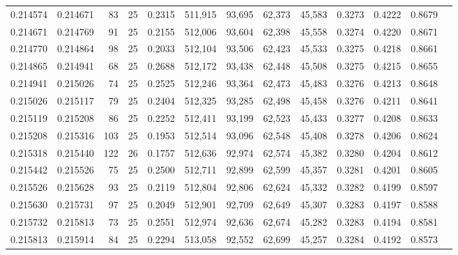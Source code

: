 \begin{tabular}{rrrrrrrrrrrrr}
0.214574 & 0.214671 &    83 &  25 &                                     0.2315 & 511,915 &  93,695 &  62,373 &  45,583 & 0.3273 & 0.4222 & 0.8679 \\
0.214671 & 0.214769 &    91 &  25 &                                     0.2155 & 512,006 &  93,604 &  62,398 &  45,558 & 0.3274 & 0.4220 & 0.8671 \\
0.214770 & 0.214864 &    98 &  25 &                                     0.2033 & 512,104 &  93,506 &  62,423 &  45,533 & 0.3275 & 0.4218 & 0.8661 \\
0.214865 & 0.214941 &    68 &  25 &                                     0.2688 & 512,172 &  93,438 &  62,448 &  45,508 & 0.3275 & 0.4215 & 0.8655 \\
0.214941 & 0.215026 &    74 &  25 &                                     0.2525 & 512,246 &  93,364 &  62,473 &  45,483 & 0.3276 & 0.4213 & 0.8648 \\
0.215026 & 0.215117 &    79 &  25 &                                     0.2404 & 512,325 &  93,285 &  62,498 &  45,458 & 0.3276 & 0.4211 & 0.8641 \\
0.215119 & 0.215208 &    86 &  25 &                                     0.2252 & 512,411 &  93,199 &  62,523 &  45,433 & 0.3277 & 0.4208 & 0.8633 \\
0.215208 & 0.215316 &   103 &  25 &                                     0.1953 & 512,514 &  93,096 &  62,548 &  45,408 & 0.3278 & 0.4206 & 0.8624 \\
0.215318 & 0.215440 &   122 &  26 &                                     0.1757 & 512,636 &  92,974 &  62,574 &  45,382 & 0.3280 & 0.4204 & 0.8612 \\
0.215442 & 0.215526 &    75 &  25 &                                     0.2500 & 512,711 &  92,899 &  62,599 &  45,357 & 0.3281 & 0.4201 & 0.8605 \\
0.215526 & 0.215628 &    93 &  25 &                                     0.2119 & 512,804 &  92,806 &  62,624 &  45,332 & 0.3282 & 0.4199 & 0.8597 \\
0.215630 & 0.215731 &    97 &  25 &                                     0.2049 & 512,901 &  92,709 &  62,649 &  45,307 & 0.3283 & 0.4197 & 0.8588 \\
0.215732 & 0.215813 &    73 &  25 &                                     0.2551 & 512,974 &  92,636 &  62,674 &  45,282 & 0.3283 & 0.4194 & 0.8581 \\
0.215813 & 0.215914 &    84 &  25 &                                     0.2294 & 513,058 &  92,552 &  62,699 &  45,257 & 0.3284 & 0.4192 & 0.8573 \\

\end{tabular}
